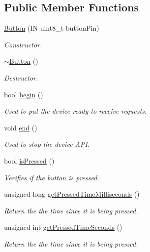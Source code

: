 \subsection*{Public Member Functions}
\begin{DoxyCompactItemize}
\item 
\hyperlink{class_easyuino_1_1_button_af0b54aae0c20a523d87681bf5f110590}{Button} (IN uint8\+\_\+t button\+Pin)
\begin{DoxyCompactList}\small\item\em Constructor. \end{DoxyCompactList}\item 
\mbox{\label{class_easyuino_1_1_button_aecbf28d076ae06ffecf29308aea22d31}} 
\hyperlink{class_easyuino_1_1_button_aecbf28d076ae06ffecf29308aea22d31}{$\sim$\+Button} ()
\begin{DoxyCompactList}\small\item\em Destructor. \end{DoxyCompactList}\item 
bool \hyperlink{class_easyuino_1_1_button_a3505f6abb646e92130701d5a1b285c76}{begin} ()
\begin{DoxyCompactList}\small\item\em Used to put the device ready to receive requests. \end{DoxyCompactList}\item 
void \hyperlink{class_easyuino_1_1_button_a0742235d911c24e7b3505f9655176532}{end} ()
\begin{DoxyCompactList}\small\item\em Used to stop the device A\+PI. \end{DoxyCompactList}\item 
bool \hyperlink{class_easyuino_1_1_button_ae0cb534e003379ef6ee49c8589a557ab}{is\+Pressed} ()
\begin{DoxyCompactList}\small\item\em Verifies if the button is pressed. \end{DoxyCompactList}\item 
unsigned long \hyperlink{class_easyuino_1_1_button_a6c2e853db61878dc0050a782dc3eaab9}{get\+Pressed\+Time\+Milliseconds} ()
\begin{DoxyCompactList}\small\item\em Return the the time since it is being pressed. \end{DoxyCompactList}\item 
unsigned int \hyperlink{class_easyuino_1_1_button_a492d3c11c2d437753f51bd25ce305966}{get\+Pressed\+Time\+Seconds} ()
\begin{DoxyCompactList}\small\item\em Return the the time since it is being pressed. \end{DoxyCompactList}\end{DoxyCompactItemize}
